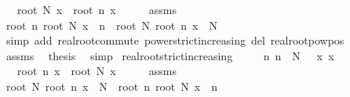 \begin{isabellebody}
\ \ \ {\isachardoublequoteopen}root\ N\ x\ {\isacharless}{\kern0pt}\ root\ n\ x{\isachardoublequoteclose}\isanewline
%
\isadelimproof
%
\endisadelimproof
%
\isatagproof
{}\isamarkupfalse%
\ {\isacharminus}{\kern0pt}\isanewline
\ \ \isamarkupfalse%
\ assms\ \isamarkupfalse%
\ {\isachardoublequoteopen}root\ n\ {\isacharparenleft}{\kern0pt}root\ N\ x{\isacharparenright}{\kern0pt}\ {\isacharcircum}{\kern0pt}\ n\ {\isacharless}{\kern0pt}\ root\ N\ {\isacharparenleft}{\kern0pt}root\ n\ x{\isacharparenright}{\kern0pt}\ {\isacharcircum}{\kern0pt}\ N{\isachardoublequoteclose}\isanewline
\ \ \ \ \isamarkupfalse%
\ {\isacharparenleft}{\kern0pt}simp\ add{\isacharcolon}{\kern0pt}\ real{\isacharunderscore}{\kern0pt}root{\isacharunderscore}{\kern0pt}commute\ power{\isacharunderscore}{\kern0pt}strict{\isacharunderscore}{\kern0pt}increasing\ del{\isacharcolon}{\kern0pt}\ real{\isacharunderscore}{\kern0pt}root{\isacharunderscore}{\kern0pt}pow{\isacharunderscore}{\kern0pt}pos{}{\isacharparenright}{\kern0pt}\isanewline
\ \ \isamarkupfalse%
\ assms\ \isamarkupfalse%
\ {\isacharquery}{\kern0pt}thesis\ \isamarkupfalse%
\ simp\isanewline
{}\isamarkupfalse%
%
\endisatagproof
{\isafoldproof}%
%
\isadelimproof
\isanewline
%
\endisadelimproof
\isanewline
{}\isamarkupfalse%
\ real{\isacharunderscore}{\kern0pt}root{\isacharunderscore}{\kern0pt}strict{\isacharunderscore}{\kern0pt}increasing{\isacharcolon}{\kern0pt}\isanewline
\ \ \ {\isachardoublequoteopen}{}\ {\isacharless}{\kern0pt}\ n{\isachardoublequoteclose}\ {\isachardoublequoteopen}n\ {\isacharless}{\kern0pt}\ N{\isachardoublequoteclose}\ {\isachardoublequoteopen}{}\ {\isacharless}{\kern0pt}\ x{\isachardoublequoteclose}\ {\isachardoublequoteopen}x\ {\isacharless}{\kern0pt}\ {}{\isachardoublequoteclose}\isanewline
\ \ \ {\isachardoublequoteopen}root\ n\ x\ {\isacharless}{\kern0pt}\ root\ N\ x{\isachardoublequoteclose}\isanewline
%
\isadelimproof
%
\endisadelimproof
%
\isatagproof
{}\isamarkupfalse%
\ {\isacharminus}{\kern0pt}\isanewline
\ \ \isamarkupfalse%
\ assms\ \isamarkupfalse%
\ {\isachardoublequoteopen}root\ N\ {\isacharparenleft}{\kern0pt}root\ n\ x{\isacharparenright}{\kern0pt}\ {\isacharcircum}{\kern0pt}\ N\ {\isacharless}{\kern0pt}\ root\ n\ {\isacharparenleft}{\kern0pt}root\ N\ x{\isacharparenright}{\kern0pt}\ {\isacharcircum}{\kern0pt}\ n{\isachardoublequoteclose}\isanewline

\end{isabellebody}
